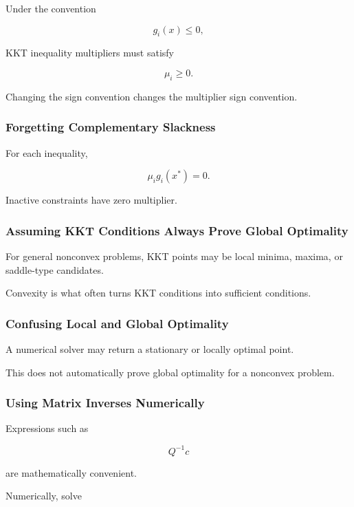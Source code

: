 Under the convention

\[
g_i(x)\leq0,
\]

KKT inequality multipliers must satisfy

\[
\boxed{
\mu_i\geq0.
}
\]

Changing the sign convention changes the multiplier sign convention.

\subsubsection{Forgetting Complementary Slackness}

For each inequality,

\[
\boxed{
\mu_i g_i(x^*)=0.
}
\]

Inactive constraints have zero multiplier.

\subsubsection{Assuming KKT Conditions Always Prove Global Optimality}

For general nonconvex problems, KKT points may be local minima, maxima,
or saddle-type candidates.

Convexity is what often turns KKT conditions into sufficient conditions.

\subsubsection{Confusing Local and Global Optimality}

A numerical solver may return a stationary or locally optimal point.

This does not automatically prove global optimality for a nonconvex
problem.

\subsubsection{Using Matrix Inverses Numerically}

Expressions such as

\[
Q^{-1}c
\]

are mathematically convenient.

Numerically, solve


